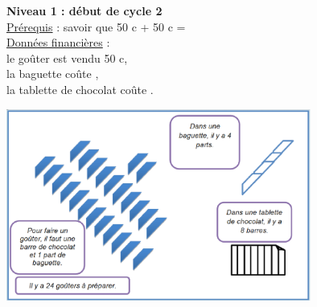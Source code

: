 {\begin{exercice*}
\begin{minipage}{7cm}
   {\bf Niveau 1 : début de cycle 2} \\ [3mm]
   \uline{Prérequis} : savoir que 50 c + 50 c =  \\ [3mm]
   \uline{Données financières} : \\
   le goûter est vendu 50 c, \\
   la baguette coûte , \\
   la tablette de chocolat coûte .
\end{minipage}
\begin{minipage}{8cm}   
   \includegraphics[width=10cm]{Grandeurs_mesures_did/Images/Grm7_activite_gouter1}
\end{minipage}


\end{exercice*}}
